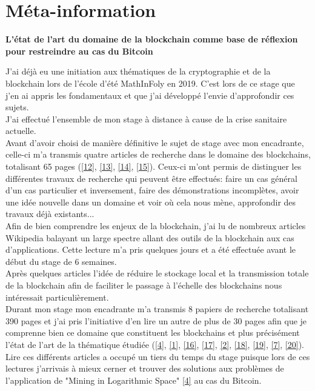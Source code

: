 \documentclass[12pt,a4paper]{article}
\newcommand{\source}[1]{\hyperlink{#1}{[#1]}}
\begin{document}
	\section{Méta-information} %
	
	\textbf{L'état de l'art du domaine de la blockchain comme base de réflexion pour restreindre au cas du Bitcoin\\}
	
	J'ai déjà eu une initiation aux thématiques de la cryptographie et de la blockchain lors de l'école d'été MathInFoly en 2019. C'est lors de ce stage que j'en ai appris les fondamentaux et que j'ai développé l'envie d'approfondir ces sujets.\\ %
	
	J'ai effectué l'ensemble de mon stage à distance à cause de la crise sanitaire actuelle.\\
	Avant d'avoir choisi de manière définitive le sujet de stage avec mon encadrante, celle-ci m'a transmis quatre articles de recherche dans le domaine des blockchains, totalisant 65 pages (\source{12}, \source{13}, \source{14}, \source{15}). Ceux-ci m'ont permis de distinguer les différentes travaux de recherche qui peuvent être effectués: faire un cas général d'un cas particulier et inversement, faire des démonstrations incomplètes, avoir une idée nouvelle dans un domaine et voir où cela nous mène, approfondir des travaux déjà existants...\\

	Afin de bien comprendre les enjeux de la blockchain, j'ai lu de nombreux articles Wikipedia balayant un large spectre allant des outils de la blockchain aux cas d'applications. Cette lecture m'a pris quelques jours et a été effectuée avant le début du stage de 6 semaines.\\%
	Après quelques articles l'idée de réduire le stockage local et la transmission totale de la blockchain afin de faciliter le passage à l'échelle des blockchains nous intéressait particulièrement.\\
	
	Durant mon stage mon encadrante m'a transmis 8 papiers de recherche totalisant 390 pages et j'ai pris l'initiative d'en lire un autre de plus de 30 pages afin que je comprenne bien ce domaine que constituent les blockchains et plus précisément l'état de l'art de la thématique étudiée (\source{4}, \source{1}, \source{16}, \source{17}, \source{2}, \source{18}, \source{19}, \source{7}, \source{20}). Lire ces différents articles a occupé un tiers du temps du stage puisque lors de ces lectures j'arrivais à mieux cerner et trouver des solutions aux problèmes de l'application de "Mining in Logarithmic Space" \source{4} au cas du Bitcoin.\\
	
\end{document}
